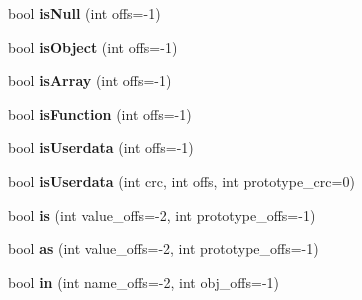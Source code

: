 \begin{DoxyCompactItemize}
\item 
bool {\bfseries is\+Null} (int offs=-\/1)\hypertarget{class_object_script_1_1_o_s_ad03ef2cf3acd82006a75fe8eabd27b0d}{}\label{class_object_script_1_1_o_s_ad03ef2cf3acd82006a75fe8eabd27b0d}

\item 
bool {\bfseries is\+Object} (int offs=-\/1)\hypertarget{class_object_script_1_1_o_s_a64db55f4aaeffdffa2a73a10363e111f}{}\label{class_object_script_1_1_o_s_a64db55f4aaeffdffa2a73a10363e111f}

\item 
bool {\bfseries is\+Array} (int offs=-\/1)\hypertarget{class_object_script_1_1_o_s_a3ae083633181313e65df7525e98d3db9}{}\label{class_object_script_1_1_o_s_a3ae083633181313e65df7525e98d3db9}

\item 
bool {\bfseries is\+Function} (int offs=-\/1)\hypertarget{class_object_script_1_1_o_s_af38aeeaaabf083669c5c9bbdfd920164}{}\label{class_object_script_1_1_o_s_af38aeeaaabf083669c5c9bbdfd920164}

\item 
bool {\bfseries is\+Userdata} (int offs=-\/1)\hypertarget{class_object_script_1_1_o_s_a81a0ed7d7fa6e4d23c6571edc699f39e}{}\label{class_object_script_1_1_o_s_a81a0ed7d7fa6e4d23c6571edc699f39e}

\item 
bool {\bfseries is\+Userdata} (int crc, int offs, int prototype\+\_\+crc=0)\hypertarget{class_object_script_1_1_o_s_a1250c2d4291bced57414774f9ffa75e6}{}\label{class_object_script_1_1_o_s_a1250c2d4291bced57414774f9ffa75e6}

\item 
bool {\bfseries is} (int value\+\_\+offs=-\/2, int prototype\+\_\+offs=-\/1)\hypertarget{class_object_script_1_1_o_s_a4ee67860b0924ae3de0364c70076d5b2}{}\label{class_object_script_1_1_o_s_a4ee67860b0924ae3de0364c70076d5b2}

\item 
bool {\bfseries as} (int value\+\_\+offs=-\/2, int prototype\+\_\+offs=-\/1)\hypertarget{class_object_script_1_1_o_s_a91f777598a4a8e619b04b63bff723f6a}{}\label{class_object_script_1_1_o_s_a91f777598a4a8e619b04b63bff723f6a}

\item 
bool {\bfseries in} (int name\+\_\+offs=-\/2, int obj\+\_\+offs=-\/1)\hypertarget{class_object_script_1_1_o_s_a5f2860b845698cf46080c880ff4c250e}{}\label{class_object_script_1_1_o_s_a5f2860b845698cf46080c880ff4c250e}


\end{DoxyCompactItemize}
